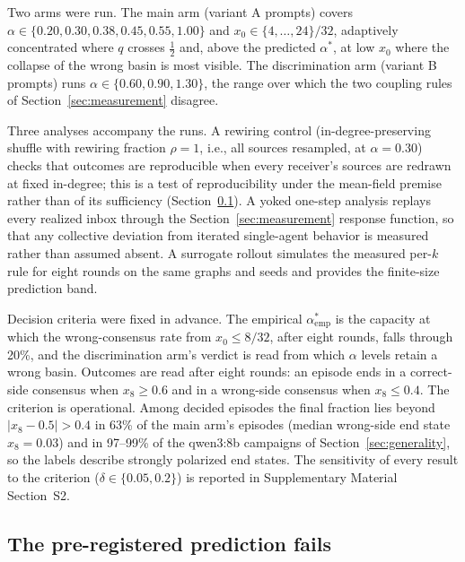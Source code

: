 \documentclass{ieeeaccess}
\newcommand{\astar}{\alpha^{*}}
\begin{document}
Two arms were run. The main arm (variant A prompts) covers
$\alpha \in \{0.20, 0.30, 0.38,\allowbreak 0.45, 0.55, 1.00\}$ and
$x_0 \in \{4,\dots,24\}/32$, adaptively concentrated where $q$ crosses
$\tfrac12$ and, above the predicted $\astar$, at low $x_0$ where the
collapse of the wrong basin is most visible. The discrimination arm
(variant B prompts) runs $\alpha \in \{0.60, 0.90, 1.30\}$, the range over
which the two coupling rules of Section~\ref{sec:measurement} disagree.

Three analyses accompany the runs. A rewiring control
(in-degree-preserving shuffle with rewiring fraction $\rho = 1$, i.e., all
sources resampled, at $\alpha = 0.30$) checks that outcomes are
reproducible when every receiver's sources are redrawn at fixed in-degree;
this is a test of reproducibility under the mean-field premise rather than
of its sufficiency (Section~\ref{sec:results}). A yoked one-step analysis
replays every realized inbox through the Section~\ref{sec:measurement}
response function, so that any collective deviation from iterated
single-agent behavior is measured rather than assumed absent. A surrogate
rollout simulates the measured per-$k$ rule for eight rounds on the same
graphs and seeds and provides the finite-size prediction band.

Decision criteria were fixed in advance. The empirical
$\astar_{\mathrm{emp}}$ is the capacity at which the wrong-consensus rate
from $x_0 \le 8/32$, after eight rounds, falls through 20\%, and the
discrimination arm's verdict is read from which $\alpha$ levels retain a
wrong basin. Outcomes are read after eight rounds: an episode ends in a
correct-side consensus when $x_8 \ge 0.6$ and in a wrong-side consensus
when $x_8 \le 0.4$. The criterion is operational. Among decided episodes
the final fraction lies beyond $|x_8 - 0.5| > 0.4$ in 63\% of the main
arm's episodes (median wrong-side end state $x_8 = 0.03$) and in 97--99\%
of the qwen3:8b campaigns of Section~\ref{sec:generality}, so the labels
describe strongly polarized end states. The sensitivity of every result to
the criterion ($\delta \in \{0.05, 0.2\}$) is reported in Supplementary Material Section~S2.

\subsection{The pre-registered prediction fails}\label{sec:results}
\end{document}

